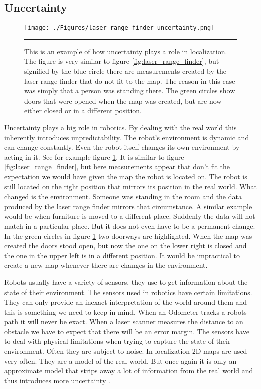\subsection{Uncertainty}
\begin{figure}[htbp]
	\centering
		\texttt{[image: ./Figures/laser\_range\_finder\_uncertainty.png]}
		\rule{35em}{0.5pt}
	\caption[Example of uncertainty when localizing with a laser range finder]{This is an example of how uncertainty plays a role in localization. The figure is very similar to figure \ref{fig:laser_range_finder}, but signified by the blue circle there are measurements created by the laser range finder that do not fit to the map. The reason in this case was simply that a person was standing there. The green circles show doors that were opened when the map was created, but are now either closed or in a different position.}
	\label{fig:laser_range_finder_uncertainty}
\end{figure}
Uncertainty plays a big role in robotics. By dealing with the real world this inherently introduces unpredictability. The robot's environment is dynamic and can change constantly. Even the robot itself changes its own environment by acting in it. See for example figure \ref{fig:laser_range_finder_uncertainty}. It is similar to figure \ref{fig:laser_range_finder}, but here measurements appear that don't fit the expectation we would have given the map the robot is located on. The robot is still located on the right position that mirrors its position in the real world. What changed is the environment. Someone was standing in the room and the data produced by the laser range finder mirrors that circumstance. A similar example would be when furniture is moved to a different place. Suddenly the data will not match in a particular place. But it does not even have to be a permanent change. In the green circles in figure \ref{fig:laser_range_finder_uncertainty} two doorways are highlighted. When the map was created the doors stood open, but now the one on the lower right is closed and the one in the upper left is in a different position. It would be impractical to create a new map whenever there are changes in the environment. 

Robots usually have a variety of sensors, they use to get information about the state of their environment. The sensors used in robotics have certain limitations. They can only provide an inexact interpretation of the world around them and this is something we need to keep in mind. When an \gls{Odometer} tracks a robots path it will never be exact. When a laser scanner measures the distance to an obstacle we have to expect that there will be an error margin. The sensors have to deal with physical limitations when trying to capture the state of their environment. Often they are subject to noise. In localization 2D maps are used very often. They are a model of the real world. But once again it is only an approximate model that strips away a lot of information from the real world and thus introduces more uncertainty \citep[p.\ 3-4]{Thrun:2005:PR:1121596}.

